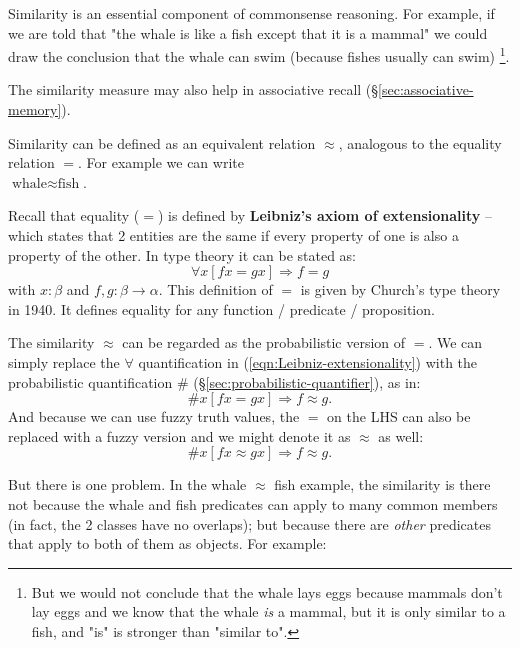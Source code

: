 Similarity is an essential component of commonsense reasoning.  For example, if we are told that "the whale is like a fish except that it is a mammal" we could draw the conclusion that the whale can swim (because fishes usually can swim) \footnote{But we would not conclude that the whale lays eggs because mammals don't lay eggs and we know that the whale \emph{is} a mammal, but it is only similar to a fish, and "is" is stronger than "similar to".}.
  
The similarity measure may also help in associative recall (\S\ref{sec:associative-memory}).

Similarity can be defined as an equivalent relation $\approx$, analogous to the equality relation $=$.  For example we can write\\
\tab $\mbox{whale} \approx \mbox{fish}$.

Recall that equality ($=$) is defined by \textbf{Leibniz's axiom of extensionality} -- which states that 2 entities are the same if every property of one is also a property of the other.  In type theory it can be stated as:
\begin{equation}
\forall x [f x = g x] \Rightarrow f = g
\label{eqn:Leibniz-extensionality}
\end{equation}
with $x : \beta$ and $f, g : \beta \rightarrow \alpha $.  This definition of $=$ is given by Church's type theory in 1940.  It defines equality for any function / predicate / proposition.

The similarity $\approx$ can be regarded as the probabilistic version of $=$.  We can simply replace the $\forall$ quantification in (\ref{eqn:Leibniz-extensionality}) with the probabilistic quantification $\#$ (\S\ref{sec:probabilistic-quantifier}), as in:
\begin{equation}
\# x [f x = g x] \Rightarrow f \approx g.
\label{eqn:probabilistic-extensionality}
\end{equation}
And because we can use fuzzy truth values, the $=$ on the LHS can also be replaced with a fuzzy version and we might denote it as $\approx$ as well:
\begin{equation}
\# x [f x \approx g x] \Rightarrow f \approx g.
\label{eqn:probabilistic-extensionality}
\end{equation}

But there is one problem.  In the whale $\approx$ fish example, the similarity is there not because the whale and fish predicates can apply to many common members (in fact, the 2 classes have no overlaps);  but because there are \textit{other} predicates that apply to both of them as objects.  For example:

